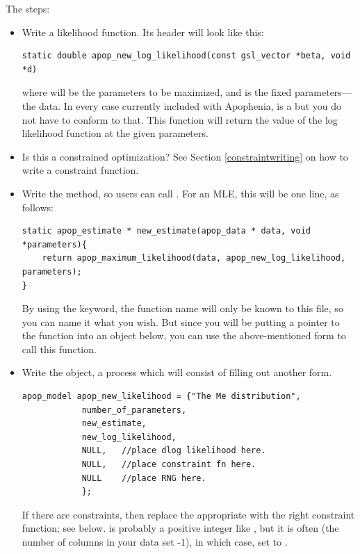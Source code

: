 The steps:

\begin{itemize}
\item Write a likelihood function. Its header will look like this:
\begin{lstlisting}
static double apop_new_log_likelihood(const gsl_vector *beta, void *d)
\end{lstlisting}
where  will be the parameters to be maximized, and  is the fixed parameters---the data. In every case currently included
with Apophenia,  is a  but you do not have to conform
to that. This function will return the value of the log likelihood function at the given parameters.

\item Is this a constrained optimization? See Section
\ref{constraintwriting} on how to write a constraint function.

\item Write the  method, so users can call 
. For an MLE, this will be one line,
as follows:
\begin{lstlisting}
static apop_estimate * new_estimate(apop_data * data, void *parameters){
    return apop_maximum_likelihood(data, apop_new_log_likelihood, parameters);
}
\end{lstlisting}
By using the  keyword, the function name will only be
known to this file, so you can name it what you wish.  But since you
will be putting a pointer to the function into an object below, you
can use the above-mentioned 
form to call this function. 


\item Write the object, a process which will consist of filling out
another form. 
\begin{lstlisting}
apop_model apop_new_likelihood = {"The Me distribution", 
            number_of_parameters, 
            new_estimate,
            new_log_likelihood, 
            NULL,   //place dlog likelihood here.
            NULL,   //place constraint fn here.
            NULL    //place RNG here.
            };
\end{lstlisting}
If there are constraints, then replace the appropriate  with the right constraint function; see below.
 is probably a positive integer like , but
it is often (the number of columns in your data set -1), in which case,
set  to .


\end{itemize}
